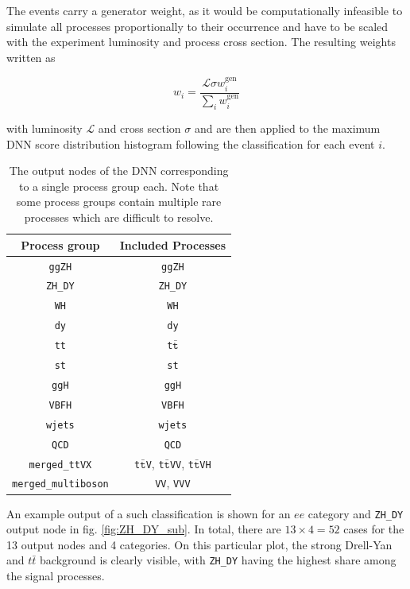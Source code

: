 The events carry a generator weight, as it would be computationally infeasible to simulate all processes proportionally to their occurrence and have to be scaled with the experiment luminosity and process cross section. The resulting weights written as

\begin{equation*}
	w_i = \frac{\mathcal{L}\sigma w^\text{gen}_i}{\sum\limits_i w^\text{gen}_i}
\end{equation*}

with luminosity $\mathcal{L}$ and cross section $\sigma$ and are then applied to the maximum DNN score distribution histogram following the classification for each event $i$.

\begin{table}[h!]
	\centering
	\begin{tabular}{cc}
		Process group & Included Processes \\
		\hline
		\texttt{ggZH} & \texttt{ggZH} \\
		\texttt{ZH\_DY} & \texttt{ZH\_DY} \\
		\texttt{WH} & \texttt{WH} \\
		\texttt{dy} & \texttt{dy} \\
		\texttt{tt} & \texttt{t}$\bar{\texttt{t}}$ \\
		\texttt{st} & \texttt{st} \\
		\texttt{ggH} & \texttt{ggH} \\
		\texttt{VBFH} & \texttt{VBFH} \\
		\texttt{wjets} & \texttt{wjets} \\
		\texttt{QCD} & \texttt{QCD} \\
		\texttt{merged\_ttVX} & \texttt{t}$\bar{\texttt{t}}$\texttt{V}, \texttt{t}$\bar{\texttt{t}}$\texttt{VV},  \texttt{t}$\bar{\texttt{t}}$\texttt{VH} \\
		\texttt{merged\_multiboson} & \texttt{VV}, \texttt{VVV} \\
	\end{tabular}
	\caption{The output nodes of the DNN corresponding to a single process group each. Note that some process groups contain multiple rare processes which are difficult to resolve.}
	\label{tab:DNN_outputs}
\end{table}

An example output of a such classification is shown for an $ee$ category and \texttt{ZH\_DY} output node in fig. \ref{fig:ZH_DY_sub}. In total, there are $13\times4 = 52$ cases for the 13 output nodes and 4 categories. On this particular plot, the strong Drell-Yan and $t\bar{t}$ background is clearly visible, with \texttt{ZH\_DY} having the highest share among the signal processes.

